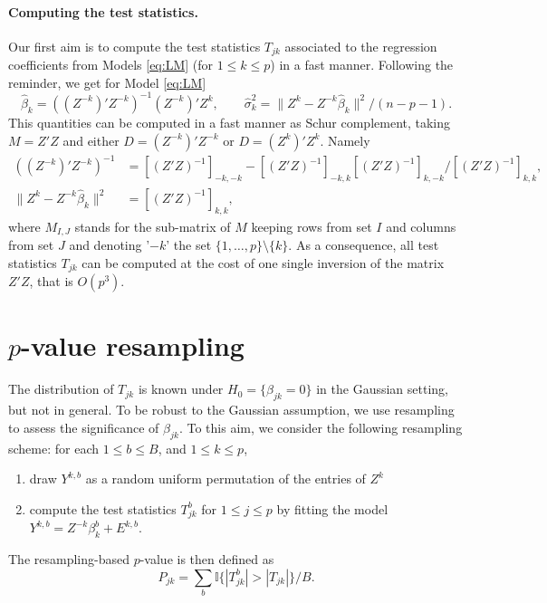 \documentclass[a4paper, 10pt]{article}
\begin{document}
\paragraph{Computing the test statistics.}
Our first aim is to compute the test statistics $T_{jk}$ associated to the regression coefficients from Models \eqref{eq:LM} (for $1 \leq k \leq p$) in a fast manner. Following the reminder, we get for Model \eqref{eq:LM}
$$
\widehat{\beta}_k = \left((Z^{-k})' Z^{-k}\right)^{-1} (Z^{-k})' Z^k, 
\qquad
\widehat{\sigma}_k^2 = \|Z^k - Z^{-k} \widehat{\beta}_k\|^2  / (n-p-1).
$$
This quantities can be computed  in a fast manner as Schur complement, taking $M = Z' Z$ and either $D = (Z^{-k})' Z^{-k}$ or $D = (Z^k)' Z^k$. Namely
\begin{align} \label{eq:Schur}
 \left((Z^{-k})' Z^{-k}\right)^{-1} & = \left[(Z' Z)^{-1}\right]_{-k, -k} - \left[(Z' Z)^{-1}\right]_{-k, k} \left[(Z' Z)^{-1}\right]_{k, -k} / \left[(Z' Z)^{-1}\right]_{k, k}, \\
 \|Z^k - Z^{-k} \widehat{\beta}_k\|^2 & = \left[(Z' Z)^{-1}\right]_{k, k}, \nonumber
\end{align}
where $M_{I, J}$ stands for the sub-matrix of $M$ keeping rows from set $I$ and columns from set $J$ and denoting '$-k$' the set $\{1, \dots, p\} \setminus \{k\}$.
As a consequence, all test statistics $T_{jk}$ can be computed at the cost of one single inversion of the matrix $Z'Z$, that is $O(p^3)$.

\section{$p$-value resampling}

The distribution of $T_{jk}$ is known under $H_0 = \{\beta_{jk} = 0\}$ in the Gaussian setting, but not in general. To be robust to the Gaussian assumption, we use resampling to assess the significance of $\beta_{jk}$. To this aim, we consider the following resampling scheme: for each $1 \leq b \leq B$, and $1 \leq k \leq p$,
\begin{enumerate}[($i$)]
 \item draw $Y^{k, b}$ as a random uniform permutation of the entries of $Z^k$
 \item compute the test statistics $T_{jk}^b$ for $1 \leq j \leq p$ by fitting the model
 $Y^{k, b} = Z^{-k} \beta^b_k + E^{k,b}$.
\end{enumerate}
The resampling-based $p$-value is then defined as
$$
P_{jk} = \sum_b \mathbb{I}\{|T_{jk}^b| > |T_{jk}|\} / B.
$$
\end{document}
